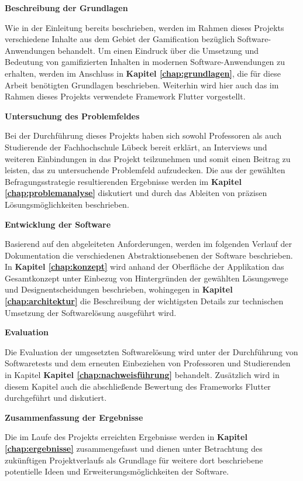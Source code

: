 \documentclass[bibliography=totoc,listof=totoc,BCOR=5mm,DIV=12,oneside]{scrbook}
\begin{document}
\par \bigskip \textbf{Beschreibung der Grundlagen}
\par Wie in der Einleitung bereits beschrieben, werden im Rahmen dieses Projekts verschiedene Inhalte aus dem Gebiet der Gamification bezüglich Software-Anwendungen behandelt. Um einen Eindruck über die Umsetzung und Bedeutung von gamifizierten Inhalten in modernen Software-Anwendungen zu erhalten, werden im Anschluss in \textbf{Kapitel \ref{chap:grundlagen}}, die für diese Arbeit benötigten Grundlagen beschrieben. Weiterhin wird hier auch das im Rahmen dieses Projekts verwendete Framework Flutter vorgestellt.

\par \bigskip \textbf{Untersuchung des Problemfeldes}
\par Bei der Durchführung dieses Projekts haben sich sowohl Professoren als auch Studierende der Fachhochschule Lübeck bereit erklärt, an Interviews und weiteren Einbindungen in das Projekt teilzunehmen und somit einen Beitrag zu leisten, das zu untersuchende Problemfeld aufzudecken. Die aus der gewählten Befragungsstrategie resultierenden Ergebnisse werden im \textbf{Kapitel \ref{chap:problemanalyse}} diskutiert und durch das Ableiten von präzisen Lösungsmöglichkeiten beschrieben.

\par \bigskip \textbf{Entwicklung der Software}
\par Basierend auf den abgeleiteten Anforderungen, werden im folgenden Verlauf der Dokumentation die verschiedenen Abstraktionsebenen der Software beschrieben. In \textbf{Kapitel \ref{chap:konzept}} wird anhand der Oberfläche der Applikation das Gesamtkonzept unter Einbezug von Hintergründen der gewählten Lösungswege und Designentscheidungen beschrieben, wohingegen in \textbf{Kapitel \ref{chap:architektur}} die Beschreibung der wichtigsten Details zur technischen Umsetzung der Softwarelösung ausgeführt wird.

\par \bigskip \textbf{Evaluation}
\par Die Evaluation der umgesetzten Softwarelösung wird unter der Durchführung von Softwaretests und dem erneuten Einbeziehen von Professoren und Studierenden in Kapitel \textbf{Kapitel \ref{chap:nachweisführung}} behandelt. Zusätzlich wird in diesem Kapitel auch die abschließende Bewertung des Frameworks Flutter durchgeführt und diskutiert.

\par \bigskip \textbf{Zusammenfassung der Ergebnisse}
\par Die im Laufe des Projekts erreichten Ergebnisse werden in \textbf{Kapitel \ref{chap:ergebnisse}} zusammengefasst und dienen unter Betrachtung des zukünftigen Projektverlaufs als Grundlage für weitere dort beschriebene potentielle Ideen und Erweiterungsmöglichkeiten der Software.
\end{document}
